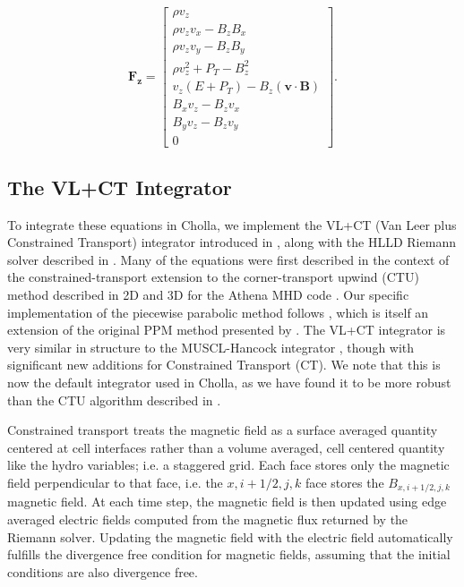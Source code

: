 \documentclass[modern, linenumbers]{aastex631}
\begin{document}
\begin{equation}
    \boldsymbol{F_z} = \begin{bmatrix}
            \rho v_{z} \\
            \rho v_{z} v_{x} - B_{z} B_{x} \\
            \rho v_{z} v_{y} - B_{z} B_{y} \\
            \rho v_{z}^2 + P_{T} - B_{z}^2 \\
            v_{z} \left( E + P_{T} \right) - B_{z} \left( \boldsymbol{v} \cdot \boldsymbol{B} \right) \\
            B_{x} v_{z} - B_{z} v_{x} \\
            B_{y} v_{z} - B_{z} v_{y} \\
            0
         \end{bmatrix}.
\end{equation}


\subsection{The VL+CT Integrator}
\label{sec:vlct-summary}

To integrate these equations in Cholla, we implement the VL+CT (Van Leer plus Constrained Transport) integrator introduced in \cite{stone_2009}, along with the HLLD Riemann solver described in \cite{hlld_2005}. Many of the equations were first described in the context of the constrained-transport extension to the corner-transport upwind (CTU) method \citep{colella_1990} described in 2D \citep{gardiner_2005} and 3D \citep{gardiner_unsplit_2008} for the Athena MHD code \citep{stone_athena_2008}. Our specific implementation of the piecewise parabolic method follows \cite{felker_2018}, which is itself an extension of the original PPM method presented by \cite{colella_1984}. The VL+CT integrator is very similar in structure to the MUSCL-Hancock integrator \citep{van_leer_2006, falle_1991, Toro}, though with significant new additions for Constrained Transport (CT). We note that this is now the default integrator used in Cholla, as we have found it to be more robust than the CTU algorithm described in \cite{schneider_2015}.

Constrained transport treats the magnetic field as a surface averaged quantity centered at cell interfaces rather than a volume averaged, cell centered quantity like the hydro variables; i.e. a staggered grid. Each face stores only the magnetic field perpendicular to that face, i.e. the $x,i+1/2,j,k$ face stores the $B_{x,i+1/2,j,k}$ magnetic field. At each time step, the magnetic field is then updated using edge averaged electric fields computed from the magnetic flux returned by the Riemann solver. Updating the magnetic field with the electric field automatically fulfills the divergence free condition for magnetic fields, assuming that the initial conditions are also divergence free.
\end{document}
